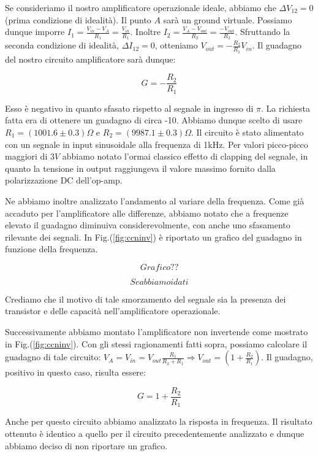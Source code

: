 Se consideriamo il nostro amplificatore operazionale ideale, abbiamo che $\Delta V_{12}=0$ (prima condizione di idealità).
Il punto $A$ sarà un ground virtuale.
Possiamo dunque imporre $I_1=\frac{V_{in}-V_A}{R_1}=\frac{V_{in}}{R_1}$.
Inoltre $I_2=\frac{V_A-V_{out}}{R_2}=\frac{-V_{out}}{R_2}$.
Sfruttando la seconda condizione di idealità, $\Delta I_{12}=0$, otteniamo $V_{out}=-\frac{R_2}{R_1} V_{in}$.
Il guadagno del nostro circuito amplificatore sarà dunque:

$$G=-\frac{R_2}{R_1}$$

Esso è negativo in quanto sfasato rispetto al segnale in ingresso di $\pi$.
La richiesta fatta era di ottenere un guadagno di circa -10.
Abbiamo dunque scelto di usare $R_1=(1001.6\pm0.3)\Omega$ e $R_2=(9987.1\pm0.3)\Omega$.
Il circuito è stato alimentato con un segnale in input sinusoidale alla frequenza di 1kHz.
Per valori picco-picco maggiori di $3V$ abbiamo notato l'ormai classico effetto di clapping del segnale, in quanto la tensione in output raggiungeva il valore massimo fornito dalla polarizzazione DC dell'op-amp. 

Ne abbiamo inoltre analizzato l'andamento al variare della frequenza.
Come già accaduto per l'amplificatore alle differenze, abbiamo notato che a frequenze elevato il guadagno diminuiva considerevolmente, con anche uno sfasamento rilevante dei segnali.
In Fig.(\ref{fig:ccninv}) è riportato un grafico del guadagno in funzione della frequenza. 

$$Grafico??$$

$$Se abbiamo i dati$$


Crediamo che il motivo di tale smorzamento del segnale sia la presenza dei transistor e delle capacità nell'amplificatore operazionale.


Successivamente abbiamo montato l'amplificatore non invertende come mostrato in Fig.(\ref{fig:ccninv}). Con gli stessi ragionamenti fatti sopra, possiamo calcolare il guadagno di tale circuito: $V_A=V_{in}=V_{out}\frac{R_1}{R_2+R_1} \Rightarrow V_{out}=(1+\frac{R_2}{R_1})$. Il guadagno, positivo in questo caso, risulta essere: 

$$G=1+\frac{R_2}{R_1}$$

Anche per questo circuito abbiamo analizzato la risposta in frequenza.
Il risultato ottenuto è identico a quello per il circuito precedentemente analizzato e dunque abbiamo deciso di non riportare un grafico.